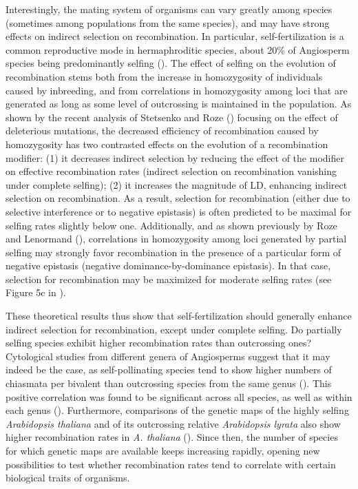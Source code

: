 \documentclass{article}
\begin{document}
Interestingly, the mating system of organisms can vary greatly among species (sometimes among populations from the same species), and may have strong effects on indirect selection on recombination. In particular, self-fertilization is a common reproductive mode in hermaphroditic species, about 20\% of Angiosperm species being predominantly selfing (\cite{barrettEvolutionPlantSexual2002}). The effect of selfing on the evolution of recombination stems both from the increase in homozygosity of individuals caused by inbreeding, and from correlations in homozygosity among loci that are generated as long as some level of outcrossing is maintained in the population. As shown by the recent analysis of Stetsenko and Roze (\citeyear{stetsenkoEvolutionRecombinationSelffertilizing2022}) focusing on the effect of deleterious mutations, the decreased efficiency of recombination caused by homozygosity has two contrasted effects on the evolution of a recombination modifier: (1) it decreases indirect selection by reducing the effect of the modifier on effective recombination rates (indirect selection on recombination vanishing under complete selfing); (2) it increases the magnitude of LD, enhancing indirect selection on recombination. As a result, selection for recombination (either due to selective interference or to negative epistasis) is often predicted to be maximal for selfing rates slightly below one. Additionally, and as shown previously by Roze and Lenormand (\citeyear{rozeSelfFertilizationEvolutionRecombination2005}), correlations in homozygosity among loci generated by partial selfing may strongly favor recombination in the presence of a particular form of negative epistasis (negative dominance-by-dominance epistasis). In that case, selection for recombination may be maximized for moderate selfing rates (see Figure 5c in \cite{stetsenkoEvolutionRecombinationSelffertilizing2022}).



These theoretical results thus show that self-fertilization should generally enhance indirect selection for recombination, except under complete selfing. Do partially selfing species exhibit higher recombination rates than outcrossing ones? Cytological studies from different genera of Angiosperms suggest that it may indeed be the case, as self-pollinating species tend to show higher numbers of chiasmata per bivalent than outcrossing species from the same genus (\cite{rozeSelfFertilizationEvolutionRecombination2005,ross-ibarraGenomeSizeRecombination2007a}). This positive correlation was found to be significant across all species, as well as within each genus (\cite{rozeSelfFertilizationEvolutionRecombination2005}). Furthermore, comparisons of the genetic maps of the highly selfing \textit{Arabidopsis thaliana} and of its outcrossing relative \textit{Arabidopsis lyrata} also show higher recombination rates in \textit{A. thaliana} (\cite{kuittinenComparingLinkageMaps2004,hanssonComparativeGeneMapping2006a,kawabeComparativeGeneMapping2006}). Since then, the number of species for which genetic maps are available keeps increasing rapidly, opening new possibilities to test whether recombination rates tend to correlate with certain biological traits of organisms.
\end{document}
